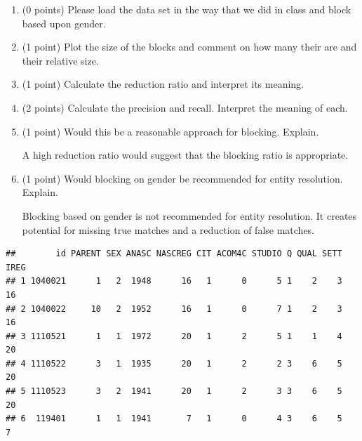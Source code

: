 \documentclass[
]{article}
\newenvironment{Shaded}{\begin{snugshade}}{\end{snugshade}}
\newcommand{\AttributeTok}[1]{\textcolor[rgb]{0.13,0.29,0.53}{#1}}
\newcommand{\CommentTok}[1]{\textcolor[rgb]{0.56,0.35,0.01}{\textit{#1}}}
\newcommand{\ConstantTok}[1]{\textcolor[rgb]{0.56,0.35,0.01}{#1}}
\newcommand{\DecValTok}[1]{\textcolor[rgb]{0.00,0.00,0.81}{#1}}
\newcommand{\FunctionTok}[1]{\textcolor[rgb]{0.13,0.29,0.53}{\textbf{#1}}}
\newcommand{\NormalTok}[1]{#1}
\newcommand{\SpecialCharTok}[1]{\textcolor[rgb]{0.81,0.36,0.00}{\textbf{#1}}}
\newcommand{\StringTok}[1]{\textcolor[rgb]{0.31,0.60,0.02}{#1}}
\begin{document}
\begin{enumerate}
\def\labelenumi{\alph{enumi}.}
\item
  (0 points) Please load the data set in the way that we did in class
  and block based upon gender.
\item
  (1 point) Plot the size of the blocks and comment on how many their
  are and their relative size.
\item
  (1 point) Calculate the reduction ratio and interpret its meaning.\\
\item
  (2 points) Calculate the precision and recall. Interpret the meaning
  of each.
\item
  (1 point) Would this be a reasonable approach for blocking. Explain.

  A high reduction ratio would suggest that the blocking ratio is
  appropriate.
\item
  (1 point) Would blocking on gender be recommended for entity
  resolution. Explain.

  Blocking based on gender is not recommended for entity resolution. It
  creates potential for missing true matches and a reduction of false
  matches.
\end{enumerate}

\begin{Shaded}
\end{Shaded}

\begin{verbatim}
##        id PARENT SEX ANASC NASCREG CIT ACOM4C STUDIO Q QUAL SETT IREG
## 1 1040021      1   2  1948      16   1      0      5 1    2    3   16
## 2 1040022     10   2  1952      16   1      0      7 1    2    3   16
## 3 1110521      1   1  1972      20   1      2      5 1    1    4   20
## 4 1110522      3   1  1935      20   1      2      2 3    6    5   20
## 5 1110523      3   2  1941      20   1      2      3 3    6    5   20
## 6  119401      1   1  1941       7   1      0      4 3    6    5    7
\end{verbatim}
\end{document}
